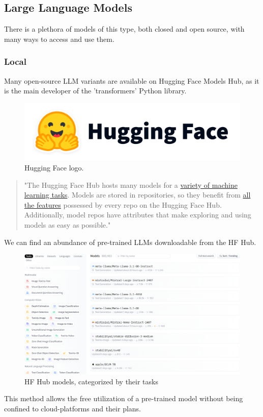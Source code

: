 \subsection{Large Language Models}
There is a plethora of models of this type, both closed and open source, with many ways to access and use them.
\subsubsection{Local}
Many open-source LLM variants are available on Hugging Face Models Hub, as it is the main developer of the 'transformers' Python library.
\begin{figure}[H]
    \centering
    \includegraphics[width=0.4\linewidth]{./figures/hf-logo.png}
    \caption{Hugging Face logo.}
\end{figure}
\begin{quote}
    "The Hugging Face Hub hosts many models for a \href{https://huggingface.co/tasks}{variety of machine learning tasks}. Models are stored in repositories, so they benefit from \href{https://huggingface.co/docs/hub/repositories}{all the features} possessed by every repo on the Hugging Face Hub. Additionally, model repos have attributes that make exploring and using models as easy as possible."  \cite{hfmhdocs}
\end{quote}
We can find an abundance of pre-trained LLMs downloadable from the HF Hub.
\begin{figure}[H]
    \centering
    \includegraphics[width=.85\linewidth]{./figures/hf-models.png}
    \caption{HF Hub models, categorized by their tasks \cite{hfmodels}}
\end{figure}
This method allows the free utilization of a pre-trained model without being confined to cloud-platforms and their plans.
